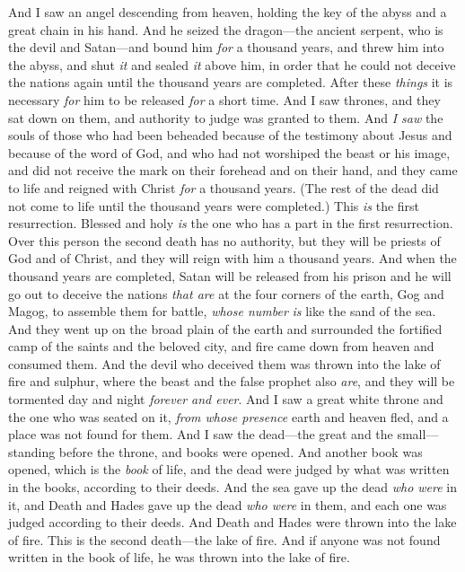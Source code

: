 \begin{biblechapter} %
 And I saw an angel descending from heaven, holding the key of the abyss and a great chain in his hand.
\verse And he seized the dragon—the ancient serpent, who is the devil and Satan—and bound him \textit{for} a thousand years,
\verse and threw him into the abyss, and shut \textit{it} and sealed \textit{it} above him, in order that he could not deceive the nations again until the thousand years are completed. After these \textit{things} it is necessary \textit{for} him to be released \textit{for} a short time.
\verse And I saw thrones, and they sat down on them, and authority to judge was granted to them. And \textit{I saw} the souls of those who had been beheaded because of the testimony about Jesus and because of the word of God, and who had not worshiped the beast or his image, and did not receive the mark on their forehead and on their hand, and they came to life and reigned with Christ \textit{for} a thousand years.
\verse (The rest of the dead did not come to life until the thousand years were completed.) This \textit{is} the first resurrection.
\verse Blessed and holy \textit{is} the one who has a part in the first resurrection. Over this person the second death has no authority, but they will be priests of God and of Christ, and they will reign with him a thousand years.
 And when the thousand years are completed, Satan will be released from his prison
\verse and he will go out to deceive the nations \textit{that are} at the four corners of the earth, Gog and Magog, to assemble them for battle, \textit{whose number} \textit{is} like the sand of the sea.
\verse And they went up on the broad plain of the earth and surrounded the fortified camp of the saints and the beloved city, and fire came down from heaven and consumed them.
\verse And the devil who deceived them was thrown into the lake of fire and sulphur, where the beast and the false prophet also \textit{are}, and they will be tormented day and night \textit{forever and ever}.
 And I saw a great white throne and the one who was seated on it, \textit{from whose presence} earth and heaven fled, and a place was not found for them.
\verse And I saw the dead—the great and the small—standing before the throne, and books were opened. And another book was opened, which is the \textit{book} of life, and the dead were judged by what was written in the books, according to their deeds.
\verse And the sea gave up the dead \textit{who were} in it, and Death and Hades gave up the dead \textit{who were} in them, and each one was judged according to their deeds.
\verse And Death and Hades were thrown into the lake of fire. This is the second death—the lake of fire.
\verse And if anyone was not found written in the book of life, he was thrown into the lake of fire.
\end{biblechapter}

